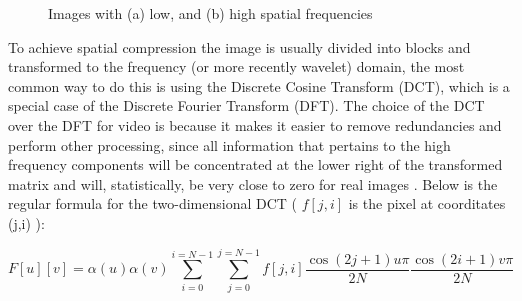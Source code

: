 \documentclass[a4paper, 12pt]{article}
\begin{document}
\begin{figure}[h]
\centering
{}
\hspace{3cm}
\caption{Images with (a) low, and (b) high spatial frequencies}
\label{fig:spatialfreq}
\end{figure}

	To achieve spatial compression the image is usually divided into blocks and transformed to the frequency (or more recently wavelet) domain, the most common way to do this is using the Discrete Cosine Transform (DCT), which is a special case of the Discrete Fourier Transform (DFT). The choice of the DCT over the DFT for video is because it makes it easier to remove redundancies and perform other processing, since all information that pertains to the high frequency components will be concentrated at the lower right of the transformed matrix and will, statistically, be very close to zero for real images \cite{gonzales}. Below is the regular formula for the two-dimensional DCT ( $ f[j,i] $ is the pixel at coorditates (j,i) ):

$$ F[u][v] = \alpha(u) \alpha(v) \sum_{i=0}^{i=N-1}{ \sum_{j=0}^{j=N-1}{f[j,i] \frac{\cos(2j+1)u\pi}{2N} \frac{\cos(2i+1)v\pi}{2N} }} $$
\end{document}
